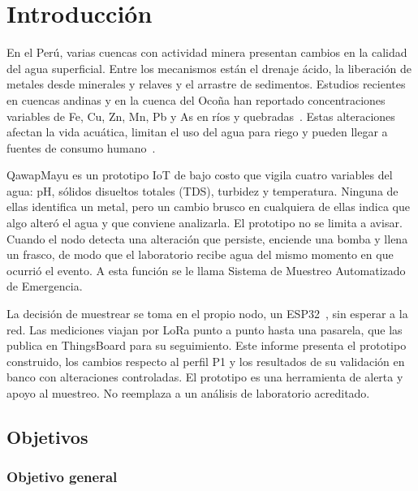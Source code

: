 \section{Introducción}
\label{sec:introduccion}

En el Perú, varias cuencas con actividad minera presentan cambios en la calidad del agua superficial. Entre los mecanismos están el drenaje ácido, la liberación de metales desde minerales y relaves y el arrastre de sedimentos. Estudios recientes en cuencas andinas y en la cuenca del Ocoña han reportado concentraciones variables de Fe, Cu, Zn, Mn, Pb y As en ríos y quebradas~\cite{moreno2024,ocona2024}. Estas alteraciones afectan la vida acuática, limitan el uso del agua para riego y pueden llegar a fuentes de consumo humano~\cite{faoWaterQuality,whoDrinkingWater2026}.

QawapMayu es un prototipo IoT de bajo costo que vigila cuatro variables del agua: pH, sólidos disueltos totales (TDS), turbidez y temperatura. Ninguna de ellas identifica un metal, pero un cambio brusco en cualquiera de ellas indica que algo alteró el agua y que conviene analizarla. El prototipo no se limita a avisar. Cuando el nodo detecta una alteración que persiste, enciende una bomba y llena un frasco, de modo que el laboratorio recibe agua del mismo momento en que ocurrió el evento. A esta función se le llama Sistema de Muestreo Automatizado de Emergencia.

La decisión de muestrear se toma en el propio nodo, un ESP32~\cite{esp32}, sin esperar a la red. Las mediciones viajan por LoRa punto a punto hasta una pasarela, que las publica en ThingsBoard para su seguimiento. Este informe presenta el prototipo construido, los cambios respecto al perfil P1 y los resultados de su validación en banco con alteraciones controladas. El prototipo es una herramienta de alerta y apoyo al muestreo. No reemplaza a un análisis de laboratorio acreditado.

\subsection{Objetivos}

\subsubsection{Objetivo general}

